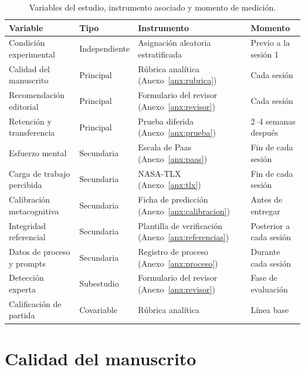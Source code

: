 \documentclass[12pt,a4paper,openany]{report}
\begin{document}
    \begin{table}[htbp]
        \centering
        \caption{Variables del estudio, instrumento asociado y momento de medici\'on.}
        \label{tab:variables}
        \footnotesize
        \begin{tabular}{L{3.6cm} L{2.0cm} L{4.3cm} L{3.4cm}}
            \toprule
            \textbf{Variable} & \textbf{Tipo} & \textbf{Instrumento} & \textbf{Momento} \\
            \midrule
            Condici\'on experimental & Independiente & Asignaci\'on aleatoria estratificada & Previo a la sesi\'on 1 \\
            Calidad del manuscrito & Principal & R\'ubrica anal\'itica (Anexo~\ref{anx:rubrica}) & Cada sesi\'on \\
            Recomendaci\'on editorial & Principal & Formulario del revisor (Anexo~\ref{anx:revisor}) & Cada sesi\'on \\
            Retenci\'on y transferencia & Principal & Prueba diferida (Anexo~\ref{anx:prueba}) & 2--4 semanas despu\'es \\
            Esfuerzo mental & Secundaria & Escala de Paas (Anexo~\ref{anx:paas}) & Fin de cada sesi\'on \\
            Carga de trabajo percibida & Secundaria & NASA-TLX (Anexo~\ref{anx:tlx}) & Fin de cada sesi\'on \\
            Calibraci\'on metacognitiva & Secundaria & Ficha de predicci\'on (Anexo~\ref{anx:calibracion}) & Antes de entregar \\
            Integridad referencial & Secundaria & Plantilla de verificaci\'on (Anexo~\ref{anx:referencias}) & Posterior a cada sesi\'on \\
            Datos de proceso y prompts & Secundaria & Registro de proceso (Anexo~\ref{anx:proceso}) & Durante cada sesi\'on \\
            Detecci\'on experta & Subestudio & Formulario del revisor (Anexo~\ref{anx:revisor}) & Fase de evaluaci\'on \\
            Calificaci\'on de partida & Covariable & R\'ubrica anal\'itica & L\'inea base \\
            \bottomrule
        \end{tabular}
    \end{table}
    
    \section{Calidad del manuscrito}
    
\end{document}
